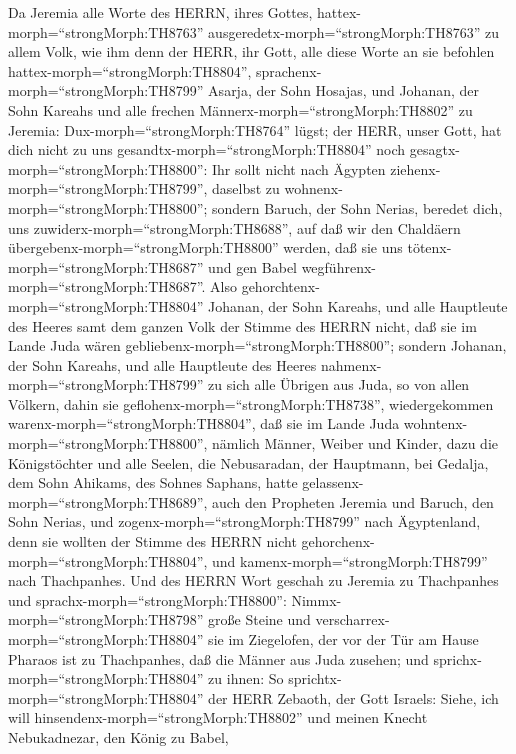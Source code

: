  Da Jeremia alle Worte des HERRN, ihres Gottes,
hattex-morph=``strongMorph:TH8763''
ausgeredetx-morph=``strongMorph:TH8763'' zu allem Volk, wie ihm denn der
HERR, ihr Gott, alle diese Worte an sie befohlen
hattex-morph=``strongMorph:TH8804'', 
sprachenx-morph=``strongMorph:TH8799'' Asarja, der Sohn Hosajas, und
Johanan, der Sohn Kareahs und alle frechen
Männerx-morph=``strongMorph:TH8802'' zu Jeremia:
Dux-morph=``strongMorph:TH8764'' lügst; der HERR, unser Gott, hat dich
nicht zu uns gesandtx-morph=``strongMorph:TH8804'' noch
gesagtx-morph=``strongMorph:TH8800'': Ihr sollt nicht nach Ägypten
ziehenx-morph=``strongMorph:TH8799'', daselbst zu
wohnenx-morph=``strongMorph:TH8800'';  sondern Baruch, der
Sohn Nerias, beredet dich, uns zuwiderx-morph=``strongMorph:TH8688'',
auf daß wir den Chaldäern übergebenx-morph=``strongMorph:TH8800''
werden, daß sie uns tötenx-morph=``strongMorph:TH8687'' und gen Babel
wegführenx-morph=``strongMorph:TH8687''.  Also
gehorchtenx-morph=``strongMorph:TH8804'' Johanan, der Sohn Kareahs, und
alle Hauptleute des Heeres samt dem ganzen Volk der Stimme des HERRN
nicht, daß sie im Lande Juda wären
gebliebenx-morph=``strongMorph:TH8800'';  sondern Johanan,
der Sohn Kareahs, und alle Hauptleute des Heeres
nahmenx-morph=``strongMorph:TH8799'' zu sich alle Übrigen aus Juda, so
von allen Völkern, dahin sie geflohenx-morph=``strongMorph:TH8738'',
wiedergekommen warenx-morph=``strongMorph:TH8804'', daß sie im Lande
Juda wohntenx-morph=``strongMorph:TH8800'',  nämlich Männer,
Weiber und Kinder, dazu die Königstöchter und alle Seelen, die
Nebusaradan, der Hauptmann, bei Gedalja, dem Sohn Ahikams, des Sohnes
Saphans, hatte gelassenx-morph=``strongMorph:TH8689'', auch den
Propheten Jeremia und Baruch, den Sohn Nerias,  und
zogenx-morph=``strongMorph:TH8799'' nach Ägyptenland, denn sie wollten
der Stimme des HERRN nicht gehorchenx-morph=``strongMorph:TH8804'', und
kamenx-morph=``strongMorph:TH8799'' nach Thachpanhes.  Und
des HERRN Wort geschah zu Jeremia zu Thachpanhes und
sprachx-morph=``strongMorph:TH8800'': 
Nimmx-morph=``strongMorph:TH8798'' große Steine und
verscharrex-morph=``strongMorph:TH8804'' sie im Ziegelofen, der vor der
Tür am Hause Pharaos ist zu Thachpanhes, daß die Männer aus Juda
zusehen;  und sprichx-morph=``strongMorph:TH8804'' zu
ihnen: So sprichtx-morph=``strongMorph:TH8804'' der HERR Zebaoth, der
Gott Israels: Siehe, ich will hinsendenx-morph=``strongMorph:TH8802''
und meinen Knecht Nebukadnezar, den König zu Babel,
